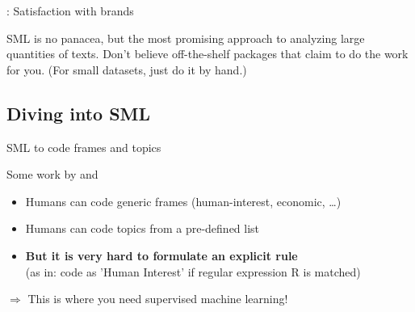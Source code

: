 \documentclass[compress]{beamer}
\begin{document}
\begin{frame}{\cite{Vermeer2019}: Satisfaction with brands}
\end{frame}



\begin{frame}[standout]
	SML is no panacea, but the most promising approach to analyzing large quantities of texts. Don't believe off-the-shelf packages that claim to do the work for you.
	(For small datasets, just do it by hand.)
\end{frame}




\subsection{Diving into SML}




\begin{frame}{SML to code frames and topics}
	\begin{block}{Some work by \cite{Burscher2014} and \cite{Burscher2015} }
		\begin{itemize}
			\item Humans can code generic frames (human-interest, economic, \ldots)
			\item Humans can code topics from a pre-defined list 
			\item<2->\textbf{But it is very hard to formulate an explicit rule} \\(as in: code as 'Human Interest' if regular expression R is matched)
		\end{itemize}
		$\Rightarrow$ This is where you need supervised machine learning!
	\end{block}
	
	
\end{frame}




{
	\begin{frame}[plain]
	\end{frame}
	
	\begin{frame}[plain]
	\end{frame}
	
	\begin{frame}[plain]
	\end{frame}
}
\end{document}
